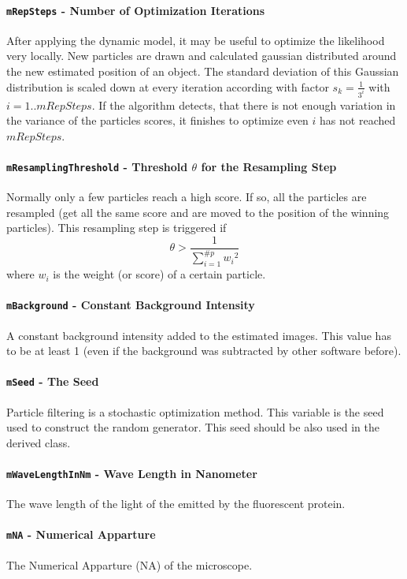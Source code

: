 \documentclass{scrartcl}
\begin{document}
\paragraph{\texttt{mRepSteps} - Number of Optimization Iterations} After applying the dynamic model, it may be useful to optimize the likelihood very locally. New particles are drawn and calculated gaussian distributed around the new estimated position of an object. The standard deviation of this Gaussian distribution is scaled down at every iteration according with factor $ s_k = \frac{1}{3^i}$ with $i = 1..mRepSteps$. If the algorithm detects, that there is not enough variation in the variance of the particles scores, it finishes to optimize even $i$ has not reached $mRepSteps$. 

\paragraph{\texttt{mResamplingThreshold} - Threshold $\theta$ for the Resampling Step} Normally only a few particles reach a high score. If so, all the particles are resampled (get all the same score and are moved to the position of the winning particles). This resampling step is triggered if \[
\theta > \frac{1}{\sum_{i=1}^{\#p}{w_i}^2}
\]
where $w_i$ is the weight (or score) of a certain particle.
\paragraph{\texttt{mBackground} - Constant Background Intensity} A constant background intensity added to the estimated images. This value has to be at least 1 (even if the background was subtracted by other software before).
\paragraph{\texttt{mSeed} - The Seed} Particle filtering is a stochastic optimization method. This variable is the seed used to construct the random generator. This seed should be also used in the derived class.
\paragraph{\texttt{mWaveLengthInNm} - Wave Length in Nanometer} The wave length of the light of the emitted by the fluorescent protein. 
\paragraph{\texttt{mNA} - Numerical Apparture} The Numerical Apparture (NA) of the microscope.
\end{document}
